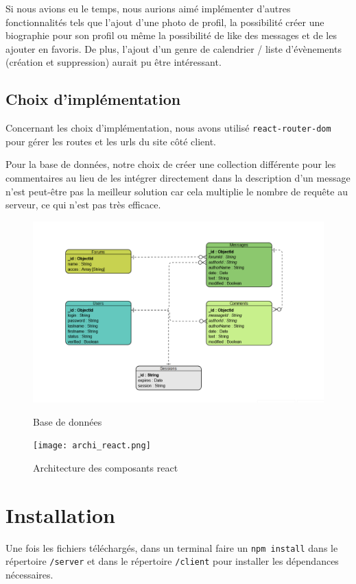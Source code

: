 \documentclass{article}
\begin{document}
Si nous avions eu le temps, nous aurions aimé implémenter d'autres fonctionnalités tels que l'ajout d'une photo de profil, la possibilité créer une biographie pour son profil ou même la possibilité de like des messages et de les ajouter en favoris.
De plus, l'ajout d'un genre de calendrier / liste d'évènements (création et suppression) aurait pu être intéressant.

\subsection{Choix d'implémentation}
Concernant les choix d'implémentation, nous avons utilisé \texttt{react-router-dom} pour gérer les routes et les urls du site côté client.

Pour la base de données, notre choix de créer une collection différente pour les commentaires au lieu de les intégrer directement dans la description d'un message n'est peut-être pas la meilleur solution car cela multiplie le nombre de requête au serveur, ce qui n'est pas très efficace.

\begin{figure}
    \includegraphics[width=1\textwidth]{BDD.png}
    \caption{Base de données}
    \texttt{[image: archi\_react.png]}
    \caption{Architecture des composants react}
\end{figure}

\newpage

\section{Installation}
Une fois les fichiers téléchargés, dans un terminal faire un \texttt{npm install} dans le répertoire \texttt{/server} et dans le répertoire \texttt{/client} pour installer les dépendances nécessaires.
\end{document}
